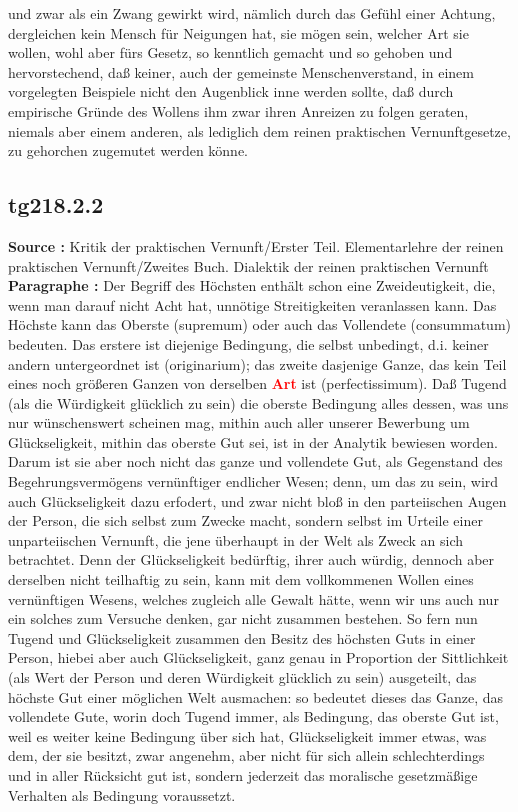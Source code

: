\documentclass[a4paper,12pt,twoside]{book}
\newcommand{\match}[1]{\textcolor{red}{\textbf{#1}}}
\begin{document}
und zwar als ein Zwang gewirkt wird, nämlich durch das Gefühl einer Achtung, dergleichen kein Mensch für Neigungen hat, sie mögen sein, welcher Art sie wollen, wohl aber fürs Gesetz, so kenntlich gemacht und so gehoben und hervorstechend, daß keiner, auch der gemeinste Menschenverstand, in einem vorgelegten Beispiele nicht den Augenblick inne werden sollte, daß durch empirische Gründe des Wollens ihm zwar ihren Anreizen zu folgen geraten, niemals aber einem anderen, als lediglich dem reinen praktischen Vernunftgesetze, zu gehorchen zugemutet werden könne. 
	
	\subsection*{tg218.2.2} 
	\textbf{Source : }Kritik der praktischen Vernunft/Erster Teil. Elementarlehre der reinen praktischen Vernunft/Zweites Buch. Dialektik der reinen praktischen Vernunft\\  
	
	\noindent\textbf{Paragraphe : }Der Begriff des Höchsten enthält schon eine Zweideutigkeit, die, wenn man darauf nicht Acht hat, unnötige Streitigkeiten veranlassen kann. Das Höchste kann das Oberste (supremum) oder auch das Vollendete (consummatum) bedeuten. Das erstere ist diejenige Bedingung, die selbst unbedingt, d.i. keiner andern untergeordnet ist (originarium); das zweite dasjenige Ganze, das kein Teil eines noch größeren Ganzen von derselben \match{Art} ist (perfectissimum). Daß Tugend (als die Würdigkeit glücklich zu sein) die oberste Bedingung alles dessen, was uns nur wünschenswert scheinen mag, mithin auch aller unserer Bewerbung um Glückseligkeit, mithin das oberste Gut sei, ist in der Analytik bewiesen worden. Darum ist sie aber noch nicht das ganze und vollendete Gut, als Gegenstand des Begehrungsvermögens vernünftiger endlicher Wesen; denn, um das zu sein, wird auch Glückseligkeit dazu erfodert, und zwar nicht bloß in den parteiischen Augen der Person, die sich selbst zum Zwecke macht, sondern selbst im Urteile einer unparteiischen Vernunft, die jene überhaupt in der Welt als Zweck an sich betrachtet. Denn der Glückseligkeit bedürftig, ihrer auch würdig, dennoch aber derselben nicht teilhaftig zu sein, kann mit dem vollkommenen Wollen eines vernünftigen Wesens, welches zugleich alle Gewalt hätte, wenn wir uns auch nur ein solches zum Versuche denken, gar nicht zusammen bestehen. So fern nun Tugend  und Glückseligkeit zusammen den Besitz des höchsten Guts in einer Person, hiebei aber auch Glückseligkeit, ganz genau in Proportion der Sittlichkeit (als Wert der Person und deren Würdigkeit glücklich zu sein) ausgeteilt, das höchste Gut einer möglichen Welt ausmachen: so bedeutet dieses das Ganze, das vollendete Gute, worin doch Tugend immer, als Bedingung, das oberste Gut ist, weil es weiter keine Bedingung über sich hat, Glückseligkeit immer etwas, was dem, der sie besitzt, zwar angenehm, aber nicht für sich allein schlechterdings und in aller Rücksicht gut ist, sondern jederzeit das moralische gesetzmäßige Verhalten als Bedingung voraussetzt. 
	
\end{document}
